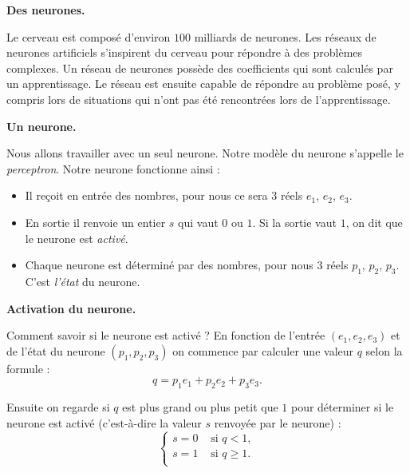 \documentclass[11pt,class=report,crop=false]{standalone}
\begin{document}

\begin{cours}[Neurone]
	

\textbf{Des neurones.}

Le cerveau est composé d'environ $100$ milliards de neurones.
Les réseaux de neurones artificiels s'inspirent du cerveau pour répondre à des problèmes complexes.
Un réseau de neurones possède des coefficients qui sont calculés par un apprentissage. Le réseau est ensuite capable de répondre au problème posé, y compris lors de situations qui n'ont pas été rencontrées lors de l'apprentissage.

\medskip

\textbf{Un neurone.}

Nous allons travailler avec un seul neurone. Notre modèle du neurone s'appelle le \emph{perceptron}.
Notre neurone fonctionne ainsi :
\begin{itemize}
	\item Il reçoit en entrée des nombres, pour nous ce sera $3$ réels $e_1$, $e_2$, $e_3$.
	\item En sortie il renvoie un entier $s$ qui vaut $0$ ou $1$. Si la sortie vaut $1$, on dit que le neurone est \emph{activé}.
	\item Chaque neurone est déterminé par des nombres, pour nous $3$ réels $p_1$, $p_2$, $p_3$. C'est \emph{l'état} du neurone.	
\end{itemize}


\medskip

\textbf{Activation du neurone.}
	
Comment savoir si le neurone est activé ? 
En fonction de l'entrée $(e_1,e_2,e_3)$ et de l'état du neurone $(p_1,p_2,p_3)$ 
on commence par calculer une valeur $q$ selon la formule :
$$q = p_1 e_1 + p_2e_2+p_3e_3.$$

Ensuite on regarde si $q$ est plus grand ou plus petit que $1$ pour déterminer si le neurone
est activé (c'est-à-dire la valeur $s$ renvoyée par le neurone) :
$$\left\{ 
\begin{array}{rl}
s = 0  & \text{ si } q < 1, \\ 	
s = 1 & \text{ si } q \ge 1. \\
\end{array}
\right.$$


\end{cours}
\end{document}
